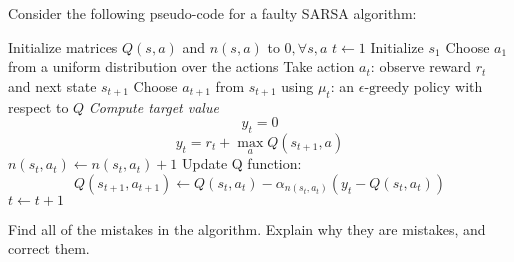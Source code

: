 \documentclass[12pt]{exam}
\newif\ifanswers
\begin{document}
\begin{question}{40}
  Consider the following pseudo-code for a faulty SARSA algorithm:
    \begin{algorithmic}
      \Procedure{SARSA}{
        number of episodes $N\in\mathbb{N}$\newline
        \phantom{\textbf{procedure} SARSA (}
        discount factor $\lambda\in(0,1]$\newline
      \phantom{\textbf{procedure} SARSA (}
      learning rate $\alpha_n=\frac{1}{\log(n+1)}$
      }
        \State Initialize matrices $Q(s,a)$ and $n(s,a)$ to $0, \forall s,a$
        \State $t\gets 1$
        \State Initialize $s_1$ 
        \State Choose $a_1$ from a uniform distribution over the actions
        \State Take action $a_t$: observe reward $r_t$ and next state $s_{t+1}$
        \State Choose $a_{t+1}$ from $s_{t+1}$ using $\mu_t$: an $\epsilon\textrm{-greedy}$ policy with respect to $Q$
         \Comment\emph{Compute target value}
        \State $$y_t=0$$
        \Else
        \State $$y_t=r_t + \max_a Q(s_{t+1},a)$$
        \EndIf
        \State $n(s_t,a_t) \gets n(s_t,a_t) + 1$
        \State Update Q function:
        $$
        Q(s_{t+1},a_{t+1})\gets Q(s_t,a_t) - \alpha_{n(s_t,a_t)}\left(y_t - Q(s_t,a_t)\right)
        $$
        \State $t\gets t + 1$
        \EndWhile
        \EndFor
        \EndProcedure
    \end{algorithmic}
  Find all of the mistakes in the algorithm. Explain why they are mistakes, and correct them.
  \begin{minipage}[t][5in]{\linewidth}
    \ifanswers
    Put answer here
    \fi
  \end{minipage}
\end{question}
\end{document}
